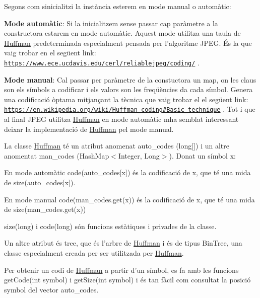 Segons com s\textquotesingle{}inicialitzi la instància esterem en mode manual o automàtic\+:
\begin{DoxyItemize}
\item {\bfseries Mode automàtic}\+: Si la inicialitzem sense passar cap paràmetre a la constructora estarem en mode automàtic. Aquest mode utilitza una taula de \hyperlink{classHuffman}{Huffman} predeterminada especialment pensada per l’algoritme J\+P\+EG. És la que vaig trobar en el següent link\+: \href{https://www.ece.ucdavis.edu/cerl/reliablejpeg/coding/}{\tt https\+://www.\+ece.\+ucdavis.\+edu/cerl/reliablejpeg/coding/} .
\item {\bfseries Mode manual}\+: Cal passar per paràmetre de la constuctora un map, on les claus son els símbols a codificar i els valors son les freqüències da cada símbol. Genera una codificació òptama mitjançant la tècnica que vaig trobar el el següent link\+: \href{https://en.wikipedia.org/wiki/Huffman_coding#Basic_technique}{\tt https\+://en.\+wikipedia.\+org/wiki/\+Huffman\+\_\+coding\#\+Basic\+\_\+technique} . Tot i que al final J\+P\+EG utilitza \hyperlink{classHuffman}{Huffman} en mode automàtic m\textquotesingle{}ha semblat interessant deixar la implementació de \hyperlink{classHuffman}{Huffman} pel mode manual.
\end{DoxyItemize}

La classe \hyperlink{classHuffman}{Huffman} té un atribut anomenat auto\+\_\+codes (long\mbox{[}\mbox{]}) i un altre anomentat man\+\_\+codes (Hash\+Map$<$\+Integer, Long$>$). Donat un símbol x\+:
\begin{DoxyItemize}
\item En mode automàtic code(auto\+\_\+codes\mbox{[}x\mbox{]}) és la codificació de x, que té una mida de size(auto\+\_\+codes\mbox{[}x\mbox{]}).
\item En mode manual code(man\+\_\+codes.\+get(x)) és la codificació de x, que té una mida de size(man\+\_\+codes.\+get(x))
\end{DoxyItemize}

size(long) i code(long) són funcions estàtiques i privades de la classe.

Un altre atribut és tree, que és l’arbre de \hyperlink{classHuffman}{Huffman} i és de tipus Bin\+Tree, una classe especialment creada per ser utilitzada per \hyperlink{classHuffman}{Huffman}.

Per obtenir un codi de \hyperlink{classHuffman}{Huffman} a partir d’un símbol, es fa amb les funcions get\+Code(int symbol) i get\+Size(int symbol) i és tan fàcil com consultat la posició symbol del vector auto\+\_\+codes.

